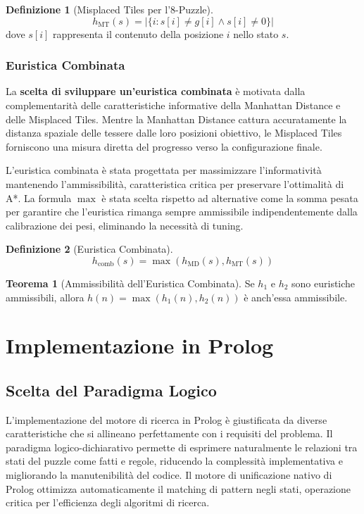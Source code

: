 \documentclass[12pt,a4paper]{report}
\theoremstyle{definition}
\newtheorem{definizione}{Definizione}[chapter]
\newtheorem{teorema}{Teorema}[chapter]
\begin{document}
\begin{definizione}[Misplaced Tiles per l'8-Puzzle]
$$h_{\text{MT}}(s) = |\{i : s[i] \neq g[i] \wedge s[i] \neq 0\}|$$
dove $s[i]$ rappresenta il contenuto della posizione $i$ nello stato $s$.
\end{definizione}

\subsection{Euristica Combinata}

La \textbf{scelta di sviluppare un'euristica combinata} è motivata dalla complementarità delle caratteristiche informative della Manhattan Distance e delle Misplaced Tiles. Mentre la Manhattan Distance cattura accuratamente la distanza spaziale delle tessere dalle loro posizioni obiettivo, le Misplaced Tiles forniscono una misura diretta del progresso verso la configurazione finale. 

L'euristica combinata è stata progettata per massimizzare l'informatività mantenendo l'ammissibilità, caratteristica critica per preservare l'ottimalità di A*. La formula $\max$ è stata scelta rispetto ad alternative come la somma pesata per garantire che l'euristica rimanga sempre ammissibile indipendentemente dalla calibrazione dei pesi, eliminando la necessità di tuning.

\begin{definizione}[Euristica Combinata]
$$h_{\text{comb}}(s) = \max(h_{\text{MD}}(s), h_{\text{MT}}(s))$$
\end{definizione}

\begin{teorema}[Ammissibilità dell'Euristica Combinata]
Se $h_1$ e $h_2$ sono euristiche ammissibili, allora $h(n) = \max(h_1(n), h_2(n))$ è anch'essa ammissibile.
\end{teorema}

\chapter{Implementazione in Prolog}

\section{Scelta del Paradigma Logico}

L'implementazione del motore di ricerca in Prolog è giustificata da diverse caratteristiche che si allineano perfettamente con i requisiti del problema. Il paradigma logico-dichiarativo permette di esprimere naturalmente le relazioni tra stati del puzzle come fatti e regole, riducendo la complessità implementativa e migliorando la manutenibilità del codice. Il motore di unificazione nativo di Prolog ottimizza automaticamente il matching di pattern negli stati, operazione critica per l'efficienza degli algoritmi di ricerca.
\end{document}

